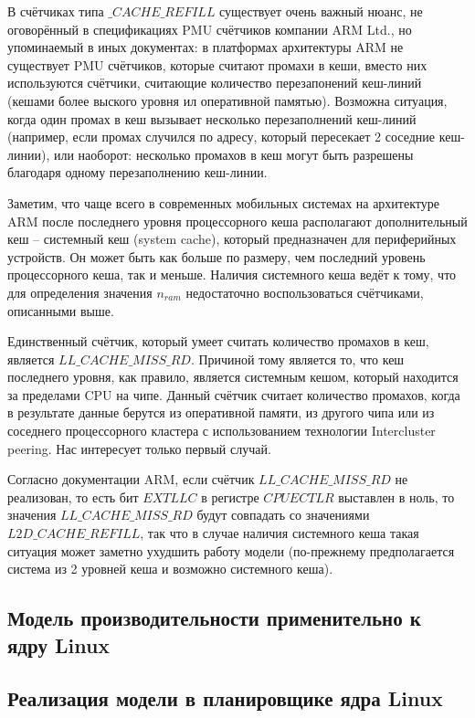     В счётчиках типа $\_CACHE\_REFILL$ существует очень важный нюанс, не оговорённый
    в спецификациях PMU счётчиков компании ARM Ltd.,
    но упоминаемый в иных документах: в платформах архитектуры ARM не существует PMU
    счётчиков, которые считают промахи в кеши, вместо них используются счётчики, считающие
    количество перезапонений кеш-линий (кешами более выского уровня ил оперативной памятью).
    Возможна ситуация, когда один промах в кеш вызывает
    несколько перезаполнений кеш-линий (например, если промах случился по адресу,
    который пересекает 2 соседние кеш-линии), или наоборот: несколько промахов
    в кеш могут быть разрешены благодаря одному перезаполнению кеш-линии.

    Заметим, что чаще всего в современных мобильных системах на архитектуре ARM после последнего
    уровня процессорного кеша располагают дополнительный кеш -- системный кеш (system cache),
    который предназначен для периферийных устройств. Он может быть как больше по размеру, чем
    последний уровень процессорного кеша, так и меньше. Наличия системного кеша ведёт к тому,
    что для определения значения $n_{ram}$ недостаточно воспользоваться счётчиками, описанными
    выше.

    Единственный счётчик, который умеет считать количество промахов в кеш, является
    $LL\_CACHE\_MISS\_RD$. Причиной тому является то, что кеш последнего уровня, как правило,
    является системным кешом, который находится за пределами CPU на чипе. Данный счётчик считает
    количество промахов, когда в результате данные берутся из оперативной памяти,
    из другого чипа или из соседнего процессорного кластера с использованием технологии
    Intercluster peering. Нас интересует только первый случай.

    Согласно документации ARM, если счётчик $LL\_CACHE\_MISS\_RD$ не реализован, то есть
    бит $EXTLLC$ в регистре $CPUECTLR$ выставлен в ноль, то значения $LL\_CACHE\_MISS\_RD$
    будут совпадать со значениями $L2D\_CACHE\_REFILL$, так что в случае наличия
    системного кеша такая ситуация может заметно ухудшить работу модели
    (по-прежнему предполагается система из 2 уровней кеша и возможно системного кеша).

\subsection{Модель производительности применительно к ядру Linux}



\subsection{Реализация модели в планировщике ядра Linux}




\newpage
